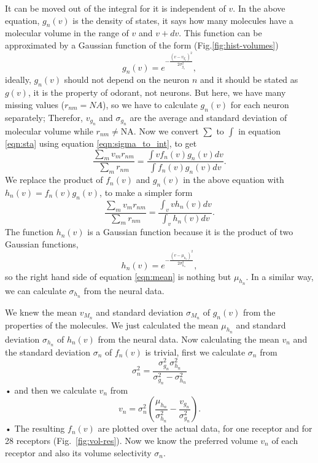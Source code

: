 \documentclass[11pt]{paper} %
\newcommand{\numberofreceptors}{28 }
\begin{document}
It can be moved out of the integral for it is independent of $v$.
In the above equation, 
$g_n(v)$ is the density of states, it says how many molecules have a molecular volume in the range of $v$ and $v+dv$.
This function can be approximated by a Gaussian function of the form (Fig.\ref{fig:hist-volumes})
\begin{equation}
	g_n(v) = e^{-\frac{(v- v_{g_n})^2}{2 \sigma_{g_n}^2}},
	\label{eqn:hist-volumes}
\end{equation}
ideally, $g_n(v)$ should not depend on the neuron $n$ and it should be stated as $g(v)$, 
it is the property of odorant, not neurons. 
But here, we have many missing values ($r_{nm} = NA$), 
so we have to calculate $g_n(v)$ for each neuron separately; 
Therefor, $v_{g_n}$ and $\sigma_{g_n}$ are the average and standard deviation of molecular volume while $r_{nm} \neq \text{NA}$.
Now we convert $\sum$ to $\int$ in equation \ref{eqn:sta} using equation \ref{eqn:sigma_to_int}, to get
\begin{equation}
	\frac{\displaystyle \sum_{m} v_m r_{nm}}{\displaystyle \sum_{m} r_{nm}} = \frac{\displaystyle \int v f_n(v) g_n(v) dv}{\displaystyle \int f_n(v) g_n(v) dv}.
	\label{eqn:sta_int}
\end{equation}
We replace the product of $f_n(v)$ and $g_n(v)$ in the above equation with $h_n(v) = f_n(v) g_n(v)$, to make a simpler form
\begin{equation}
	\frac{\displaystyle \sum_{m} v_m r_{nm}}{\displaystyle \sum_{m} r_{nm}} = \frac{\displaystyle \int_v v h_n(v) dv}{ \displaystyle \int_v  h_n(v) dv }.
	\label{eqn:mean}
\end{equation}
The function $h_n(v)$ is a Gaussian function because it is the product of two Gaussian functions, 
\begin{equation}
h_n(v) = e^{-\frac{(v-\mu_{h_n})^2}{2\sigma_{h_n}^2}}, 
\end{equation}
so the right hand side of equation \ref{eqn:mean} is nothing but $\mu_{h_n}$. 
In a similar way, we can calculate $\sigma_{h_n}$ from the neural data.

We knew the mean $v_{M_n}$ and standard deviation $\sigma_{M_n}$ of $g_n(v)$ from the properties of the molecules. 
We just calculated the mean $\mu_{h_n}$ and standard deviation $\sigma_{h_n}$ of $h_n(v)$ from the neural data.
Now calculating the mean $v_n$ and the standard deviation $\sigma_n$ of $f_n(v)$ is trivial,
first we calculate $\sigma_n$ from 
\begin{equation}
	\sigma_n^2 = \frac{\sigma^2_{g_n} \sigma^2_{h_n}}{\sigma^2_{g_n} - \sigma^2_{h_n}}
\end{equation}•
and then we calculate $v_n$ from 
\begin{equation}
	v_n =  \sigma_n^2 \left ( \frac{\mu_{h_n}}{\sigma^2_{h_n}} - \frac{v_{g_n}}{\sigma^2_{g_n}} \right ).
\end{equation}•
The resulting $f_n(v)$ are plotted over the actual data, for one receptor and for \numberofreceptors  receptors (Fig.~\ref{fig:vol-res}).
Now we know the preferred volume $v_n$ of each receptor and also its volume selectivity $\sigma_n$.
\end{document}
